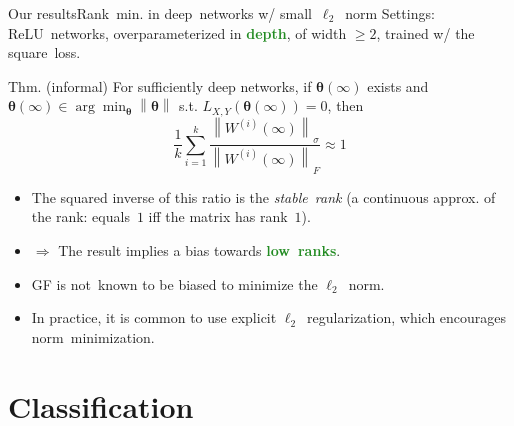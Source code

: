 \documentclass[handout,usenames,dvipsnames]{beamer} %
\newcommand{\norm}[2][]{{\left\|{#2}\right\|_{#1}}}
\newcommand{\btheta}{{\boldsymbol{\theta}}}
\newcommand{\true}[1]{{\textcolor{ForestGreen}{\textbf{#1}}}}
\begin{document}
\begin{frame}{Our results}{Rank~min. in deep~networks w/ small~$\ell_2$~norm}
    \pause
    Settings: ReLU~networks, overparameterized in \true{depth}, of width $\ge 2$, trained w/ the square~loss.
    \pause
    \begin{exampleblock}{Thm. (informal)}
        For sufficiently deep networks, if $\btheta(\infty)$ exists and $\btheta(\infty) \in \arg\min_{\btheta} \norm{\btheta}$ s.t. $L_{X,Y}(\btheta(\infty)) = 0$, then 
        \[
        \frac{1}{k}\sum_{i=1}^{k} \frac{\norm{W^{(i)}(\infty)}_\sigma}{\norm{W^{(i)}(\infty)}_F}
        \approx 1
        \]
    \end{exampleblock}
    \pause
    \begin{itemize}
        \item The squared inverse of this ratio is the \emph{stable~rank} (a continuous approx. of the rank: equals~$1$ iff the matrix has rank~$1$).
        \pause
        \item $\Rightarrow$ The result implies a bias towards \true{low~ranks}.
        \pause
        \item GF is \alert{not}~known to be biased to minimize the $\ell_2$~norm.
        \pause
        \item In practice, it is common to use explicit $\ell_2$~regularization, which encourages norm~minimization.
    \end{itemize}
    
\end{frame}






\section{Classification}
\end{document}
